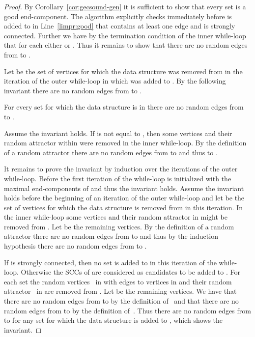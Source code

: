 \documentclass[11pt,letterpaper]{article}
\begin{document}
\begin{proof}
By Corollary~\ref{cor:gecsound-gen} it is sufficient to show that every set 
 is a good end-component. The algorithm explicitly
checks immediately before  is added to  in Line~\ref{limpr:good}
that  contains at least one edge and is strongly connected. Further 
we have by the termination condition of the inner while-loop that for each 
 either  or . Thus it remains to show that there are no random edges from 
to . 

Let  be the set of vertices for which the data 
structure  was removed from  in the iteration of the outer while-loop
in which  was added to . By the following invariant there are no random 
edges from  to . 
\begin{invariant}\label{inv:streettnorand}
	For every set  for which the data structure  is in  there 
	are no random edges from  to .
\end{invariant}
Assume the invariant holds. If  is not equal to , then
some vertices and their random attractor within  were removed in the 
inner while-loop. By the definition of a random attractor there are no random 
edges from  to  and thus to . 

It 
remains to prove the invariant by induction over the iterations of the outer
while-loop.
Before the first iteration of the while-loop  is initialized with
the maximal end-components of  and thus the invariant holds. 
Assume the invariant holds before the beginning of an iteration of the outer while-loop
and let  be the set of vertices for which the data structure 
is removed from  in this iteration. In the inner while-loop some vertices 
and their random attractor in  might be removed from . Let  be 
the remaining vertices. By the definition of a random attractor there are no 
random edges from  to  and thus by the induction hypothesis
there are no random edges from  to .

If  is strongly connected, then no set is added to  in this iteration
of the while-loop. 
Otherwise the SCCs  of  are considered as candidates to be 
added to . For each set  the random vertices~ in 
with edges to vertices in  and their random attractor~
in  are removed from . Let  be the remaining vertices.
We have that there are no random edges from  to  by the
definition of~ and that there are no random edges from  to  by the definition of~. Thus there are no random 
edges from  to  for any set  for which the 
data structure is added to , which shows the invariant.
\end{proof}
\end{document}
